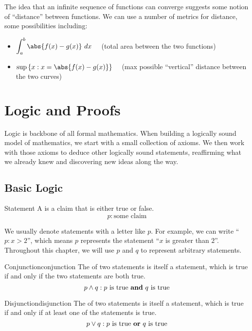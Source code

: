 \documentclass[12pt]{report}
\begin{document}
The idea that an infinite sequence of functions can converge suggests some notion of ``distance'' between functions. We can use a number of metrics for distance, some possibilities including:
\begin{itemize}
    \item \( \displaystyle \int_a^b \abs{f(x) - g(x)}\ dx \quad \) (total area between the two functions)
    \item \( \displaystyle \sup \left\{ x : x = \abs{f(x) - g(x)} \right\} \quad \) (max possible ``vertical'' distance between the two curves)
\end{itemize}

\chapter{Logic and Proofs}

Logic is backbone of all formal mathematics. When building a logically sound model of mathematics, we start with a small collection of axioms. We then work with those axioms to deduce other logically sound statements, reaffirming what we already knew and discovering new ideas along the way.

\section{Basic Logic}
\begin{dfnbox}{Statement}{}
    A  is a claim that is either true or false.
    \tcblower
    \[ p : \text{some claim} \]
\end{dfnbox}

We usually denote statements with a letter like $p$. For example, we can write ``$p: x > 2$'', which means $p$ represents the statement ``$x$ is greater than $2$''. Throughout this chapter, we will use $p$ and $q$ to represent arbitrary statements.

\begin{dfnbox}{Conjunction}{conjunction}
    The  of two statements is itself a statement, which is true if and only if the two statements are both true.
    \tcblower
    \[ p \land q : p\ \text{is true \textbf{and}}\ q\ \text{is true} \]
\end{dfnbox}

\begin{dfnbox}{Disjunction}{disjunction}
    The  of two statements is itself a statement, which is true if and only if at least one of the statements is true.
    \tcblower
    \[ p \lor q : p\ \text{is true \textbf{or}}\ q\ \text{is true} \]
\end{dfnbox}
\end{document}
